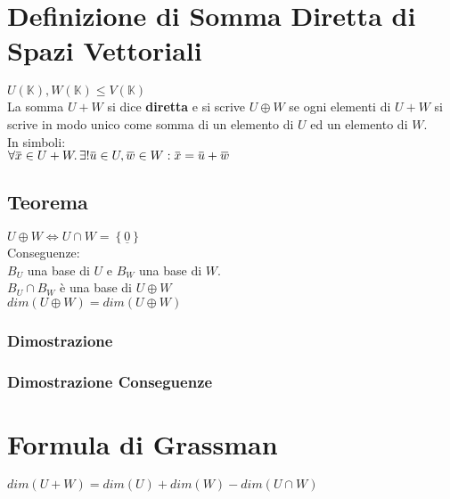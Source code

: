 \documentclass[a4paper, twoside, italian, 11pt]{book}
\newcommand{\braces}[1] {\left \{ #1 \right \}}
\newcommand{\overbar}[1] {\mkern 1.5mu\overline{\mkern-1.5mu#1\mkern-1.5mu}\mkern 1.5mu}
\newcommand{\K}{\mathbb K}
\begin{document}
\section{Definizione di Somma Diretta di Spazi Vettoriali}

$U(\K), W(\K) \leq V(\K)$ \\

\noindent
La somma $U + W$ si dice \textbf{diretta} e si scrive $U \oplus W$ se ogni elementi di $U + W$ si scrive in modo unico come somma di un elemento di $U$ ed un elemento di $W$. \\

\noindent
In simboli: \\

$\forall \overbar x \in U + W \ldotp \exists! \overbar u \in U, \overbar w \in W : \overbar x = \overbar u + \overbar w$


\subsection{Teorema}

$U \oplus W \iff U \cap W = \braces{\underline 0}$ \\

\noindent
Conseguenze: \\

\noindent
$B_U$ una base di $U$ e $B_W$ una base di $W$. \\
$B_U \cap B_W$ è una base di $U \oplus W$ \\

\noindent
$dim(U \oplus W) = dim(U \oplus W)$


\subsubsection{Dimostrazione}



\subsubsection{Dimostrazione Conseguenze}




\section{Formula di Grassman}

$dim(U + W) = dim(U) + dim(W) - dim(U \cap W)$ \\\\
\end{document}
